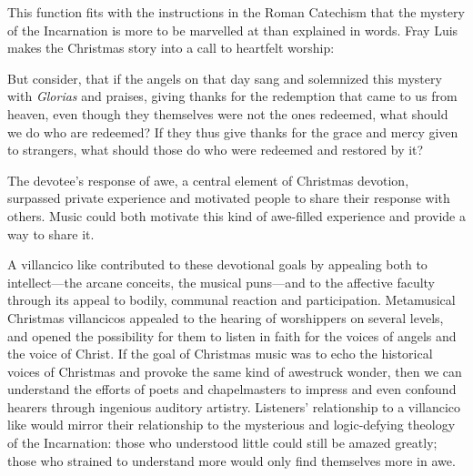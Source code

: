 This function fits with the instructions in the Roman Catechism that the mystery
of the Incarnation is more to be marvelled at than explained in words.
Fray Luis makes the Christmas story into a call to heartfelt worship:
\begin{quoting}
    But consider, that if the angels on that day sang and solemnized this
    mystery with \emph{Glorias} and praises, giving thanks for the redemption
    that came to us from heaven, even though they themselves were not the ones
    redeemed, what should we do who are redeemed?
    If they thus give thanks for the grace and mercy given to strangers, what
    should those do who were redeemed and restored by it?%
    \Autocite[41]{LuisdeGranada:Xmas}
\end{quoting}
The devotee's response of awe, a central element of Christmas devotion,
surpassed private experience and motivated people to share their response with
others.
Music could both motivate this kind of awe-filled experience and provide a way
to share it.

A villancico like  contributed to these
devotional goals by appealing both to intellect---the arcane conceits, the
musical puns---and to the affective faculty through its appeal to bodily,
communal reaction and participation.
Metamusical Christmas villancicos appealed to the hearing of worshippers on
several levels, and opened the possibility for them to listen in faith for the
voices of angels and the voice of Christ.
If the goal of Christmas music was to echo the historical voices of Christmas
and provoke the same kind of awestruck wonder, then we can understand the
efforts of poets and chapelmasters to impress and even confound hearers through
ingenious auditory artistry.
Listeners' relationship to a villancico like 
would mirror their relationship to the mysterious and logic-defying theology of
the Incarnation: those who understood little could still be amazed greatly;
those who strained to understand more would only find themselves more in awe.

\endinput
